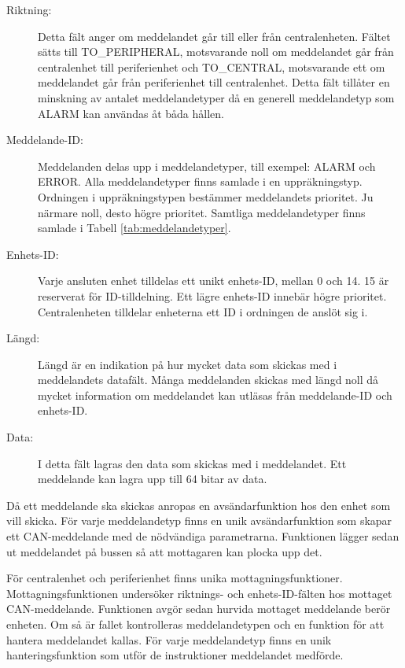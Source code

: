 \documentclass[a4paper]{article}
\begin{document}
\begin{description}
    \item[Riktning:] Detta fält anger om meddelandet går till eller från centralenheten.
    Fältet sätts till TO\_PERIPHERAL, motsvarande noll om meddelandet går från centralenhet till periferienhet och TO\_CENTRAL, motsvarande ett om meddelandet går från periferienhet till centralenhet.
    Detta fält tillåter en minskning av antalet meddelandetyper då en generell meddelandetyp som ALARM kan användas åt båda hållen.

    \item[Meddelande-ID:] Meddelanden delas upp i meddelandetyper, till exempel: ALARM och ERROR.
    Alla meddelandetyper finns samlade i en uppräkningstyp.
    Ordningen i uppräkningstypen bestämmer meddelandets prioritet.
    Ju närmare noll, desto högre prioritet.
    Samtliga meddelandetyper finns samlade i Tabell \ref{tab:meddelandetyper}.

    \item[Enhets-ID:] Varje ansluten enhet tilldelas ett unikt enhets-ID, mellan 0 och 14.
    15 är reserverat för ID-tilldelning. Ett lägre enhets-ID innebär högre prioritet.
    Centralenheten tilldelar enheterna ett ID i ordningen de anslöt sig i.

    \item[Längd:] Längd är en indikation på hur mycket data som skickas med i meddelandets datafält.
    Många meddelanden skickas med längd noll då mycket information om meddelandet kan utläsas från meddelande-ID och enhets-ID.

    \item[Data:] I detta fält lagras den data som skickas med i meddelandet.
    Ett meddelande kan lagra upp till 64 bitar av data.
\end{description}

Då ett meddelande ska skickas anropas en avsändarfunktion hos den enhet som vill skicka.
För varje meddelandetyp finns en unik avsändarfunktion som skapar ett CAN-meddelande med de nödvändiga parametrarna.
Funktionen lägger sedan ut meddelandet på bussen så att mottagaren kan plocka upp det.

För centralenhet och periferienhet finns unika mottagningsfunktioner.
Mottagningsfunktionen undersöker riktnings- och enhets-ID-fälten hos mottaget CAN-meddelande.
Funktionen avgör sedan hurvida mottaget meddelande berör enheten.
Om så är fallet kontrolleras meddelandetypen och en funktion för att hantera meddelandet kallas.
För varje meddelandetyp finns en unik hanteringsfunktion som utför de instruktioner meddelandet medförde.
\end{document}
